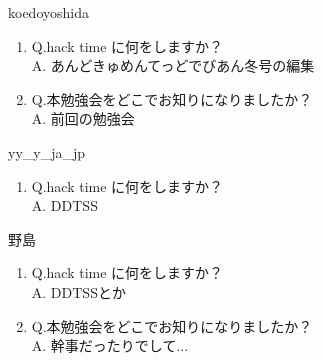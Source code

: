 \begin{prework}{ koedoyoshida }
  \begin{enumerate}
  \item Q.hack time に何をしますか？\\
    A. あんどきゅめんてっどでびあん冬号の編集
  \item Q.本勉強会をどこでお知りになりましたか？\\
    A. 前回の勉強会
  \end{enumerate}
\end{prework}

\begin{prework}{ yy\_y\_ja\_jp }
  \begin{enumerate}
  \item Q.hack time に何をしますか？\\
    A. DDTSS
  \end{enumerate}
\end{prework}

\begin{prework}{ 野島 }
  \begin{enumerate}
  \item Q.hack time に何をしますか？\\
    A. DDTSSとか
  \item Q.本勉強会をどこでお知りになりましたか？\\
    A. 幹事だったりでして...
  \end{enumerate}
\end{prework}




